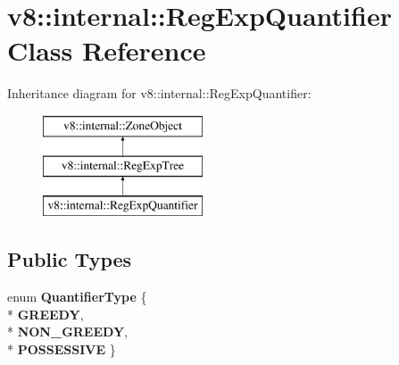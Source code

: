 \hypertarget{classv8_1_1internal_1_1_reg_exp_quantifier}{}\section{v8\+:\+:internal\+:\+:Reg\+Exp\+Quantifier Class Reference}
\label{classv8_1_1internal_1_1_reg_exp_quantifier}
Inheritance diagram for v8\+:\+:internal\+:\+:Reg\+Exp\+Quantifier\+:\begin{figure}[H]
\begin{center}
\leavevmode
\includegraphics[height=3.000000cm]{classv8_1_1internal_1_1_reg_exp_quantifier}
\end{center}
\end{figure}
\subsection*{Public Types}
\begin{DoxyCompactItemize}
\item 
enum {\bfseries Quantifier\+Type} \{ \\*
{\bfseries G\+R\+E\+E\+DY}, 
\\*
{\bfseries N\+O\+N\+\_\+\+G\+R\+E\+E\+DY}, 
\\*
{\bfseries P\+O\+S\+S\+E\+S\+S\+I\+VE}
 \}\hypertarget{classv8_1_1internal_1_1_reg_exp_quantifier_aa9c83c35aa00f3975ba0c62f7877142e}{}\label{classv8_1_1internal_1_1_reg_exp_quantifier_aa9c83c35aa00f3975ba0c62f7877142e}

\end{DoxyCompactItemize}
